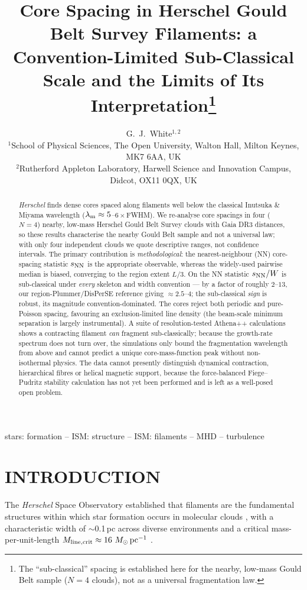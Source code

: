 \documentclass[usenatbib,twoside,twocolumn]{mnras}
\title[Sub-classical core spacing in HGBS filaments]{Core Spacing in Herschel Gould Belt Survey Filaments: a Convention-Limited Sub-Classical Scale and the Limits of Its Interpretation\thanks{The ``sub-classical'' spacing is established here for the nearby, low-mass Gould Belt sample ($N=4$ clouds), not as a universal fragmentation law.}}
\author[G.~J.~White]{G.~J.~White$^{1,2}$\\
$^{1}$School of Physical Sciences, The Open University, Walton Hall, Milton Keynes, MK7 6AA, UK\\
$^{2}$Rutherford Appleton Laboratory, Harwell Science and Innovation Campus, Didcot, OX11 0QX, UK}
\begin{document}
\maketitle

\begin{abstract}
\textit{Herschel} finds dense cores spaced along filaments well below the classical Inutsuka \& Miyama wavelength ($\lambda_{\rm m}\approx5$--$6\times$FWHM). We re-analyse core spacings in four ($N=4$) nearby, low-mass Herschel Gould Belt Survey clouds with Gaia DR3 distances, so these results characterise the nearby Gould Belt sample and not a universal law; with only four independent clouds we quote descriptive ranges, not confidence intervals. The primary contribution is \emph{methodological}: the nearest-neighbour (NN) core-spacing statistic $s_{\rm NN}$ is the appropriate observable, whereas the widely-used pairwise median is biased, converging to the region extent $L/3$. On the NN statistic $s_{\rm NN}/W$ is sub-classical under \emph{every} skeleton and width convention --- by a factor of roughly $2$--$13$, our region-Plummer/DisPerSE reference giving $\approx2.5$--$4$; the sub-classical \emph{sign} is robust, its magnitude convention-dominated. The cores reject both periodic and pure-Poisson spacing, favouring an exclusion-limited line density (the beam-scale minimum separation is largely instrumental). A suite of resolution-tested Athena++ calculations shows a contracting filament \emph{can} fragment sub-classically; because the growth-rate spectrum does not turn over, the simulations only bound the fragmentation wavelength from above and cannot predict a unique core-mass-function peak without non-isothermal physics. The data cannot presently distinguish dynamical contraction, hierarchical fibres or helical magnetic support, because the force-balanced Fiege--Pudritz stability calculation has not yet been performed and is left as a well-posed open problem.
\end{abstract}


\begin{keywords}
stars: formation -- ISM: structure -- ISM: filaments -- MHD -- turbulence
\end{keywords}

\section{INTRODUCTION}

The \textit{Herschel} Space Observatory established that filaments are the fundamental structures within which star formation occurs in molecular clouds \citep{Andre2010}, with a characteristic width of $\sim$0.1\,pc across diverse environments \citep{Arzoumanian2011} and a critical mass-per-unit-length $M_{\rm line,crit}\approx16~M_\odot\,{\rm pc^{-1}}$ \citep{Ostriker1964}.
\end{document}
